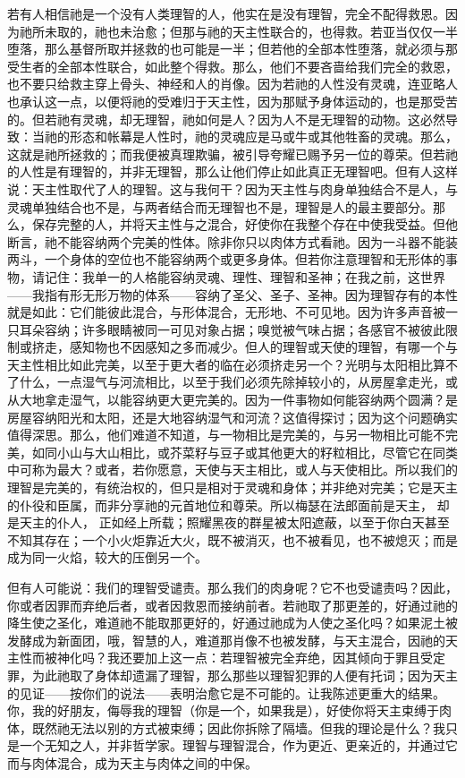 若有人相信祂是一个没有人类理智的人，他实在是没有理智，完全不配得救恩。因为祂所未取的，祂也未治愈；但那与祂的天主性联合的，也得救。若亚当仅仅一半堕落，那么基督所取并拯救的也可能是一半；但若他的全部本性堕落，就必须与那受生者的全部本性联合，如此整个得救。那么，他们不要吝啬给我们完全的救恩，也不要只给救主穿上骨头、神经和人的肖像。因为若祂的人性没有灵魂，连亚略人也承认这一点，以便将祂的受难归于天主性，因为那赋予身体运动的，也是那受苦的。但若祂有灵魂，却无理智，祂如何是人？因为人不是无理智的动物。这必然导致：当祂的形态和帐幕是人性时，祂的灵魂应是马或牛或其他牲畜的灵魂。那么，这就是祂所拯救的；而我便被真理欺骗，被引导夸耀已赐予另一位的尊荣。但若祂的人性是有理智的，并非无理智，那么让他们停止如此真正无理智吧。但有人这样说：天主性取代了人的理智。这与我何干？因为天主性与肉身单独结合不是人，与灵魂单独结合也不是，与两者结合而无理智也不是，理智是人的最主要部分。那么，保存完整的人，并将天主性与之混合，好使你在我整个存在中使我受益。但他断言，祂不能容纳两个完美的性体。除非你只以肉体方式看祂。因为一斗器不能装两斗，一个身体的空位也不能容纳两个或更多身体。但若你注意理智和无形体的事物，请记住：我单一的人格能容纳灵魂、理性、理智和圣神；在我之前，这世界——我指有形无形万物的体系——容纳了圣父、圣子、圣神。因为理智存有的本性就是如此：它们能彼此混合，与形体混合，无形地、不可见地。因为许多声音被一只耳朵容纳；许多眼睛被同一可见对象占据；嗅觉被气味占据；各感官不被彼此限制或挤走，感知物也不因感知之多而减少。但人的理智或天使的理智，有哪一个与天主性相比如此完美，以至于更大者的临在必须挤走另一个？光明与太阳相比算不了什么，一点湿气与河流相比，以至于我们必须先除掉较小的，从房屋拿走光，或从大地拿走湿气，以能容纳更大更完美的。因为一件事物如何能容纳两个圆满？是房屋容纳阳光和太阳，还是大地容纳湿气和河流？这值得探讨；因为这个问题确实值得深思。那么，他们难道不知道，与一物相比是完美的，与另一物相比可能不完美，如同小山与大山相比，或芥菜籽与豆子或其他更大的籽粒相比，尽管它在同类中可称为最大？或者，若你愿意，天使与天主相比，或人与天使相比。所以我们的理智是完美的，有统治权的，但只是相对于灵魂和身体；并非绝对完美；它是天主的仆役和臣属，而非分享祂的元首地位和尊荣。所以梅瑟在法郎面前是天主， 却是天主的仆人， 正如经上所载；照耀黑夜的群星被太阳遮蔽，以至于你白天甚至不知其存在；一个小火炬靠近大火，既不被消灭，也不被看见，也不被熄灭；而是成为同一火焰，较大的压倒另一个。\par

但有人可能说：我们的理智受谴责。那么我们的肉身呢？它不也受谴责吗？因此，你或者因罪而弃绝后者，或者因救恩而接纳前者。若祂取了那更差的，好通过祂的降生使之圣化，难道祂不能取那更好的，好通过祂成为人使之圣化吗？如果泥土被发酵成为新面团，哦，智慧的人，难道那肖像不也被发酵，与天主混合，因祂的天主性而被神化吗？我还要加上这一点：若理智被完全弃绝，因其倾向于罪且受定罪，为此祂取了身体却遗漏了理智，那么那些以理智犯罪的人便有托词；因为天主的见证——按你们的说法——表明治愈它是不可能的。让我陈述更重大的结果。你，我的好朋友，侮辱我的理智（你是一个，如果我是），好使你将天主束缚于肉体，既然祂无法以别的方式被束缚；因此你拆除了隔墙。但我的理论是什么？我只是一个无知之人，并非哲学家。理智与理智混合，作为更近、更亲近的，并通过它而与肉体混合，成为天主与肉体之间的中保。\par

